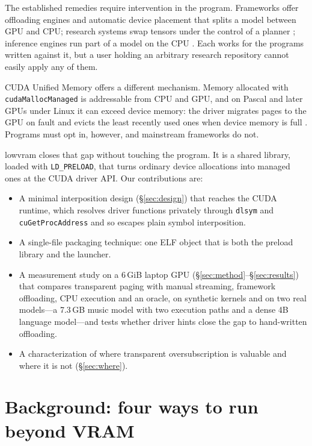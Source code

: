 \documentclass[11pt]{article}
\begin{document}
The established remedies require intervention in the program. Frameworks offer offloading engines
\cite{zero-offload,zero-infinity,flexgen} and automatic device placement \cite{accelerate} that
splits a model between GPU and CPU; research systems swap tensors under the control of a planner
\cite{vdnn,swapadvisor,capuchin}; inference engines run part of a model on the CPU
\cite{llamacpp,powerinfer,ktransformers}. Each works for the programs written against it, but a user
holding an arbitrary research repository cannot easily apply any of them.

CUDA Unified Memory \cite{cuda-guide} offers a different mechanism. Memory allocated with
\texttt{cudaMallocManaged} is addressable from CPU and GPU, and on Pascal and later GPUs under Linux
it can exceed device memory: the driver migrates pages to the GPU on fault and evicts the least
recently used ones when device memory is full \cite{zheng2016,ganguly2019}. Programs must opt in,
however, and mainstream frameworks do not.

lowvram closes that gap without touching the program. It is a shared library, loaded with
\texttt{LD\_PRELOAD}, that turns ordinary device allocations into managed ones at the CUDA driver
API. Our contributions are:
\begin{itemize}
  \item A minimal interposition design (\S\ref{sec:design}) that reaches the CUDA runtime, which
        resolves driver functions privately through \texttt{dlsym} and \texttt{cuGetProcAddress}
        and so escapes plain symbol interposition.
  \item A single-file packaging technique: one ELF object that is both the preload library and
        the launcher.
  \item A measurement study on a 6\,GiB laptop GPU (\S\ref{sec:method}--\S\ref{sec:results}) that
        compares transparent paging with manual streaming, framework offloading, CPU execution and
        an oracle, on synthetic kernels and on two real models---a 7.3\,GB music model with two
        execution paths and a dense 4B language model---and tests whether driver hints close the
        gap to hand-written offloading.
  \item A characterization of where transparent oversubscription is valuable and where it is
        not (\S\ref{sec:where}).
\end{itemize}

\section{Background: four ways to run beyond VRAM}
\label{sec:background}
\end{document}
